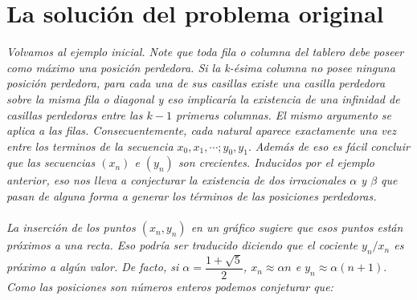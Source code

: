 \section{La soluci\'on del problema original}
\textit{Volvamos al ejemplo inicial. Note que toda fila o columna del tablero debe poseer como m\'aximo una posici\'on perdedora. Si la k-\'esima columna no posee ninguna posici\'on perdedora, para cada una de sus casillas existe una casilla perdedora sobre la misma fila o diagonal y eso implicar\'ia la existencia de una infinidad de casillas perdedoras entre las $k - 1$ primeras columnas. El mismo argumento se aplica a las filas. Consecuentemente, cada natural aparece exactamente una vez entre los terminos de la secuencia $x_{0},x_{1},\cdots;y_{0},y_{1}.$ Adem\'as de eso es f\'acil concluir que las secuencias $(x_{n})$ e $(y_{n})$ son crecientes. Inducidos por el ejemplo anterior, eso nos lleva a conjecturar la existencia de dos irracionales $\alpha$ y $\beta$ que pasan de alguna forma a generar los t\'erminos de las posiciones perdedoras.\\
\\	
La inserci\'on de los puntos $(x_{n}, y_{n})$ en un gr\'afico sugiere que esos puntos est\'an pr\'oximos a una recta. Eso podr\'ia ser traducido diciendo que el cociente $y_{n}/x_{n}$ es pr\'oximo a alg\'un valor. De facto, si $\alpha = \dfrac{1 + \sqrt{5}}{2}$, $x_{n} \approx \alpha n$ e $y_{n} \approx \alpha (n + 1).$ Como las posiciones son n\'umeros enteros podemos conjeturar que:}
